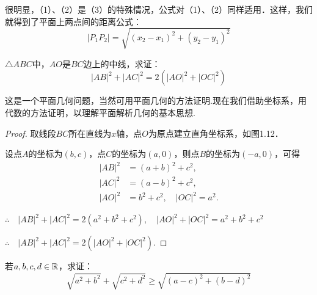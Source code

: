 很明显，（1）、（2）是（3）的特殊情况，公式对（1）、（2）同样适用．这样，我们就得到了平面上两点间的距离公式：
\[|P_1P_2|=\sqrt{(x_2-x_1)^2+(y_2-y_1)^2}\]





\begin{example}
$\triangle ABC$中，$AO$是$BC$边上的中线，求证：
\[|AB|^2+|AC|^2=2(|AO|^2+|OC|^2)\]
\end{example}

\begin{analyze}
这是一个平面几何问题，当然可用平面几何的方法证明.现在我们借助坐标系，用代数的方法证明，以理解平面解析几何的基本思想.
\end{analyze}

\begin{proof}

\noindent
\begin{minipage}{.55\textwidth}
\CTEXindent 取线段$BC$所在直线为$x$轴，点$O$为原点建立直角坐标系，如图1.12．

设点$A$的坐标为$(b,c)$，点$C$的坐标为$(a,0)$，则点$B$的坐标为$(-a,0)$，可得
\[\begin{split}
|AB|^2&=(a+b)^2+c^2,\\
|AC|^2&=(a-b)^2+c^2,\\
|AO|^2&=b^2+c^2,\quad |OC|^2=a^2.    
\end{split}\]    
\end{minipage}\hfill
\begin{minipage}{.45\textwidth}
\centering
{}
\end{minipage}

$\therefore\quad |AB|^2+|AC|^2=2(a^2+b^2+c^2),\quad |AO|^2+|OC|^2=a^2+b^2+c^2$

$\therefore\quad |AB|^2+|AC|^2=2(|AO|^2+|OC|^2)$.
\end{proof}

\begin{example}
若$a,b,c,d\in\mathbb{R}$，求证：
$$\sqrt{a^2+b^2}+\sqrt{c^2+d^2}\ge \sqrt{(a-c)^2+(b-d)^2}$$
\end{example}

